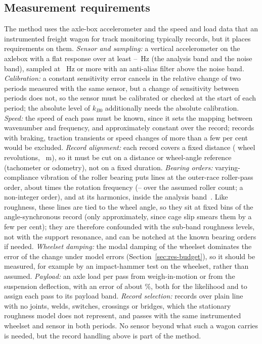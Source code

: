 \subsection{Measurement requirements}\label{sec:requirements}
The method uses the axle-box accelerometer and the speed and load data that an instrumented freight
wagon for track monitoring typically records, but it places requirements on them.
\emph{Sensor and sampling:} a vertical accelerometer on the axlebox with a flat response over at least
\BandLo--\NoiseHi~Hz (the analysis band and the noise band), sampled at \SampleRate~Hz or more with an
anti-alias filter above the noise band. \emph{Calibration:} a constant sensitivity error cancels in the
relative change of two periods measured with the same sensor, but a change of sensitivity between periods
does not, so the sensor must be calibrated or checked at the start of each period; the absolute level of
$k_{B0}$ additionally needs the absolute calibration. \emph{Speed:} the speed of each pass must be known,
since it sets the mapping between wavenumber and frequency, and approximately constant over the record;
records with braking, traction transients or speed changes of more than a few per cent would be
excluded. \emph{Record alignment:} each record covers a fixed distance (\NumRevs{} wheel revolutions,
\RecordLength~m), so it must be cut on a distance or wheel-angle reference (tachometer or odometry), not
on a fixed duration. \emph{Bearing orders:} varying-compliance vibration of the roller bearing puts
lines at the outer-race roller-pass order, about \BearingOrderOR{} times the rotation frequency
(\BearingOrderORLo--\BearingOrderORHi{} over the assumed roller count; a non-integer order), and at its
harmonics, inside the analysis band~\citep{zheng2025}. Like roughness, these lines are tied to the wheel
angle, so they sit at fixed bins of the angle-synchronous record (only approximately, since cage slip
smears them by a few per cent); they are therefore confounded with the sub-band roughness levels, not
with the support resonance, and can be notched at the known bearing orders if needed. \emph{Wheelset
damping:} the modal damping of the wheelset dominates the error of the change under model errors
(Section~\ref{sec:res-budget}), so it should be measured, for example by an impact-hammer test on the
wheelset, rather than assumed. \emph{Payload:} an axle load per pass from weigh-in-motion or from the suspension
deflection, with an error of about \WIMsigmaPct\%, both for the likelihood and to assign each pass to
its payload band. \emph{Record selection:} records over plain line with no joints, welds,
switches, crossings or bridges, which the stationary roughness model does not represent, and passes
with the same instrumented wheelset and sensor in both periods. No sensor beyond what such a wagon
carries is needed, but the record handling above is part of the method.

